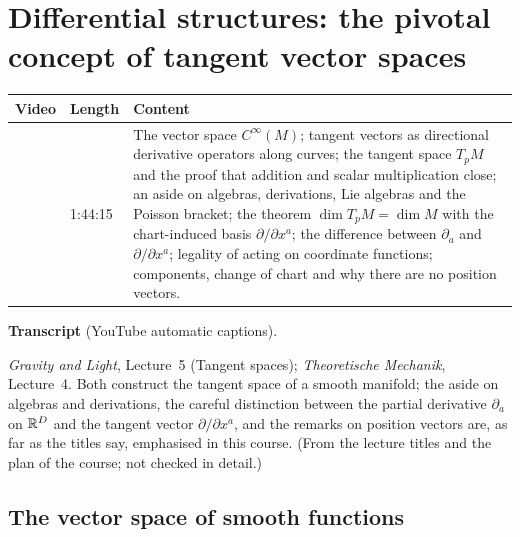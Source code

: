 \chapter{Differential structures: the pivotal concept of tangent vector spaces}\label{ch:l09}
\begin{paracol}{2}

\begin{sources}
\begin{tabularx}{\linewidth}{@{}l l L@{}}
\toprule
\textbf{Video} & \textbf{Length} & \textbf{Content}\\
\midrule
{} & 1:44:15 & The vector space $C^\infty(M)$; tangent vectors as directional derivative operators along curves;
the tangent space $T_pM$ and the proof that addition and scalar multiplication close; an aside on algebras, derivations, Lie algebras and the Poisson bracket; the theorem $\dim T_pM=\dim M$ with the chart-induced basis
$\partial/\partial x^a$; the difference between $\partial_a$ and $\partial/\partial x^a$; legality of acting on coordinate functions; components, change of chart and why there are no position vectors.\\
\bottomrule
\end{tabularx}

\smallskip
\textbf{Transcript}  (YouTube automatic captions).
\end{sources}

\begin{reading}
\emph{Gravity and Light}, Lecture~5 (Tangent spaces); \emph{Theoretische Mechanik}, Lecture~4. Both construct the tangent space of a smooth manifold; the aside on algebras and derivations, the careful distinction between the partial
derivative $\partial_a$ on $\mathbb{R}^D$ and the tangent vector $\partial/\partial x^a$, and the remarks on position vectors are, as far as the titles say, emphasised in this course.
(From the lecture titles and the plan of the course; not checked in detail.)
\end{reading}

\section{The vector space of smooth functions}\label{sec:tv-cinf}


\end{paracol}
